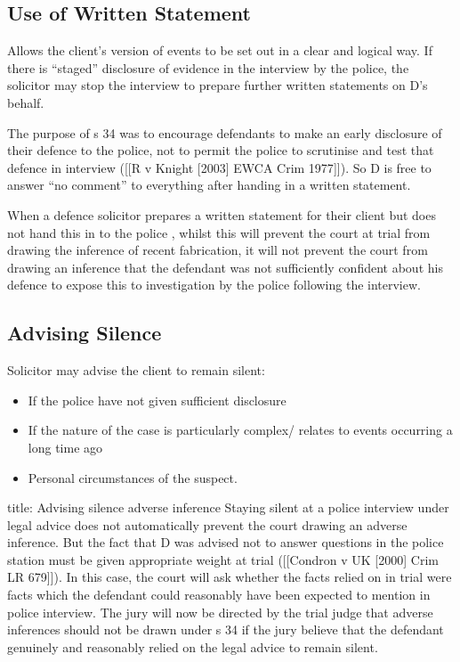 \documentclass[
]{article}
\newenvironment{Shaded}{}{}
\newcommand{\NormalTok}[1]{#1}
\providecommand{\tightlist}{%
  \setlength{\itemsep}{0pt}\setlength{\parskip}{0pt}}
\begin{document}
\hypertarget{use-of-written-statement}{%
\subsection{Use of Written Statement}\label{use-of-written-statement}}

Allows the client's version of events to be set out in a clear and
logical way. If there is ``staged'' disclosure of evidence in the
interview by the police, the solicitor may stop the interview to prepare
further written statements on D's behalf.

The purpose of s 34 was to encourage defendants to make an early
disclosure of their defence to the police, not to permit the police to
scrutinise and test that defence in interview ({[}{[}R v Knight
{[}2003{]} EWCA Crim 1977{]}{]}). So D is free to answer ``no comment''
to everything after handing in a written statement.

When a defence solicitor prepares a written statement for their client
but does not hand this in to the police , whilst this will prevent the
court at trial from drawing the inference of recent fabrication, it will
not prevent the court from drawing an inference that the defendant was
not sufficiently confident about his defence to expose this to
investigation by the police following the interview.

\hypertarget{advising-silence}{%
\subsection{Advising Silence}\label{advising-silence}}

Solicitor may advise the client to remain silent:

\begin{itemize}
\tightlist
\item
  If the police have not given sufficient disclosure
\item
  If the nature of the case is particularly complex/ relates to events
  occurring a long time ago
\item
  Personal circumstances of the suspect.
\end{itemize}

\begin{Shaded}
\begin{Highlighting}[]
\NormalTok{title: Advising silence adverse inference}
\NormalTok{Staying silent at a police interview under legal advice does not automatically prevent the court drawing an adverse inference. But the fact that D was advised not to answer questions in the police station must be given appropriate weight at trial ([[Condron v UK [2000] Crim LR 679]]). In this case, the court will ask whether the facts relied on in trial were facts which the defendant could reasonably have been expected to mention in police interview. The jury will now be directed by the trial judge that adverse inferences should not be drawn under s 34 if the jury believe that the defendant genuinely and reasonably relied on the legal advice to remain silent.}
\end{Highlighting}
\end{Shaded}
\end{document}
